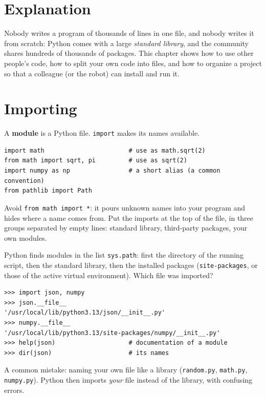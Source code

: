 \label{ch:py6}

\section*{Explanation}
Nobody writes a program of thousands of lines in one file, and nobody writes it from scratch: Python comes with a large \emph{standard library}, and the community shares hundreds of thousands of packages. This chapter shows how to use other people's code, how to split your own code into files, and how to organize a project so that a colleague (or the robot) can install and run it.

\section*{Importing}
A \textbf{module} is a Python file. \texttt{import} makes its names available.
\begin{verbatim}
import math                       # use as math.sqrt(2)
from math import sqrt, pi         # use as sqrt(2)
import numpy as np                # a short alias (a common convention)
from pathlib import Path
\end{verbatim}
Avoid \verb!from math import *!: it pours unknown names into your program and hides where a name comes from. Put the imports at the top of the file, in three groups separated by empty lines: standard library, third-party packages, your own modules.

Python finds modules in the list \texttt{sys.path}: first the directory of the running script, then the standard library, then the installed packages (\texttt{site-packages}, or those of the active virtual environment). Which file was imported?
\begin{verbatim}
>>> import json, numpy
>>> json.__file__
'/usr/local/lib/python3.13/json/__init__.py'
>>> numpy.__file__
'/usr/local/lib/python3.13/site-packages/numpy/__init__.py'
>>> help(json)                    # documentation of a module
>>> dir(json)                     # its names
\end{verbatim}
A common mistake: naming your own file like a library (\texttt{random.py}, \texttt{math.py}, \texttt{numpy.py}). Python then imports \emph{your} file instead of the library, with confusing errors.

